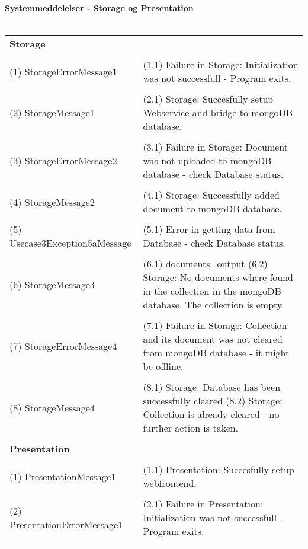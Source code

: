 \begin{appendices}
\pagebreak
\textbf{Systemmeddelelser - Storage og Presentation} \\ \\
\begin{tabular}{ p{6cm} | p{6cm} }
	\textbf{Storage} 			    & \\ \\
	(1) StorageErrorMessage1 		& (1.1) Failure in Storage: Initialization was not successfull - Program exits. \\ \\
	(2) StorageMessage1 			& (2.1) Storage: Succesfully setup Webservice and bridge to mongoDB database. \\ \\
	(3) StorageErrorMessage2		& (3.1) Failure in Storage: Document was not uploaded to mongoDB database - check Database status. \\ \\
	(4) StorageMessage2 			& (4.1) Storage: Successfully added document to mongoDB database. \\ \\
	(5) Usecase3Exception5aMessage 	& (5.1) Error in getting data from Database - check Database status. \\ \\
	(6) StorageMessage3 			& (6.1) documents\_output \newline \newline (6.2) Storage: No documents where found in the collection in the mongoDB database. The collection is empty. \\ \\
	(7) StorageErrorMessage4 		& (7.1) Failure in Storage: Collection and its document was not cleared from mongoDB database - it might be offline. \\ \\
	(8) StorageMessage4 			& (8.1) Storage: Database has been successfully cleared \newline \newline (8.2) Storage: Collection is already cleared - no further action is taken. \\ \\
	
	\textbf{Presentation} 	        & \\ \\
	(1) PresentationMessage1	    & (1.1) Presentation: Succesfully setup webfrontend. \\ \\
	(2) PresentationErrorMessage1   & (2.1) Failure in Presentation: Initialization was not successfull - Program exits. \\ \\
\end{tabular}


\end{appendices}
